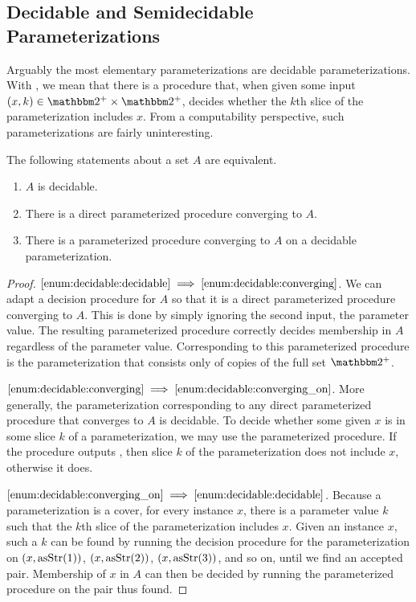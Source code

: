 \subsection{Decidable and Semidecidable Parameterizations}
\label{sec:computability:decidable}%
Arguably the most elementary parameterizations are decidable parameterizations.
With , we mean that there is a procedure that, when given some input $(x, k) \in \binary^+ \times \binary^+$, decides whether the $k$th slice of the parameterization includes $x$.
From a computability perspective, such parameterizations are fairly uninteresting.
\begin{theorem}
\label{thm:decidable}%
  The following statements about a set $A$ are equivalent.
  \begin{enumerate}[series=enum:decidable]
  \item\label{enum:decidable:decidable}
    $A$ is decidable.
  \item\label{enum:decidable:converging}
    There is a direct parameterized procedure converging to $A$.
  \item\label{enum:decidable:converging_on}
    There is a parameterized procedure converging to $A$ on a decidable parameterization.
  \end{enumerate}
\end{theorem}
\begin{proof}
$\ref{enum:decidable:decidable} \implies \ref{enum:decidable:converging}$.
  We can adapt a decision procedure for $A$ so that it is a direct parameterized procedure converging to $A$.
  This is done by simply ignoring the second input, the parameter value.
  The resulting parameterized procedure correctly decides membership in $A$ regardless of the parameter value.
  Corresponding to this parameterized procedure is the parameterization that consists only of copies of the full set $\binary^+$.

$\ref{enum:decidable:converging} \implies \ref{enum:decidable:converging_on}$.
  More generally, the parameterization corresponding to any direct parameterized procedure that converges to $A$ is decidable.
  To decide whether some given $x$ is in some slice $k$ of a parameterization, we may use the parameterized procedure.
  If the procedure outputs , then slice $k$ of the parameterization does not include $x$, otherwise it does.

$\ref{enum:decidable:converging_on} \implies \ref{enum:decidable:decidable}$.
  Because a parameterization is a cover, for every instance $x$, there is a parameter value $k$ such that the $k$th slice of the parameterization includes $x$.
  Given an instance $x$, such a $k$ can be found by running the decision procedure for the parameterization on $(x, \operatorname{asStr}(1))$, $(x, \operatorname{asStr}(2))$, $(x, \operatorname{asStr}(3))$, and so on, until we find an accepted pair.
  Membership of $x$ in $A$ can then be decided by running the parameterized procedure on the pair thus found.
\end{proof}

